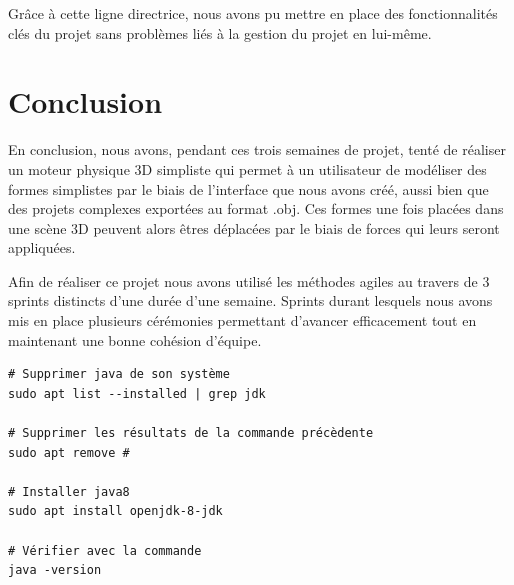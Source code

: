 \documentclass[11pt]{report}
\begin{document}
Grâce à cette ligne directrice, nous avons pu mettre en place des fonctionnalités clés du projet sans problèmes liés à la gestion du projet en lui-même.

\chapter{Conclusion}

En conclusion, nous avons, pendant ces trois semaines de projet, tenté de réaliser un moteur physique 3D simpliste qui permet à un utilisateur de modéliser des formes simplistes par le biais de l'interface que nous avons créé, aussi bien que des projets complexes exportées au format .obj. Ces formes une fois placées dans une scène 3D peuvent alors êtres déplacées par le biais de forces qui leurs seront appliquées.\newline

Afin de réaliser ce projet nous avons utilisé les méthodes agiles au travers de 3 sprints distincts d'une durée d'une semaine. Sprints durant lesquels nous avons mis en place plusieurs cérémonies permettant d'avancer efficacement tout en maintenant une bonne cohésion d'équipe.\newline

\begin{verbatim}
# Supprimer java de son système
sudo apt list --installed | grep jdk

# Supprimer les résultats de la commande précèdente
sudo apt remove #

# Installer java8
sudo apt install openjdk-8-jdk

# Vérifier avec la commande
java -version
\end{verbatim}
\end{document}
